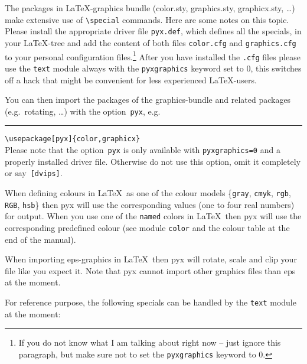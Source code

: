The packages in \LaTeX-graphics bundle (color.sty, graphics.sty,
graphicx.sty, \ldots) make extensive use of \verb|\special| commands. Here
are some notes on this topic. Please install the appropriate driver file
\verb|pyx.def|, which defines all the specials, in your \LaTeX-tree and add
the content of both files \verb|color.cfg| and \verb|graphics.cfg| to your
personal configuration files.\footnote{If you do not know what I am talking about
right now -- just ignore this paragraph, but make sure not to set the
\texttt{pyxgraphics} keyword to 0.} After you have installed the \verb|.cfg|
files please use the \verb|text| module always with the \verb|pyxgraphics|
keyword set to 0, this switches off a hack that might be convenient for less
experienced \LaTeX-users.\medskip

You can then import the packages of the graphics-bundle and related packages
(e.g.~rotating, \ldots) with the option~\verb|pyx|, e.g.{}\\
\rule{0.1\linewidth}{0sp}\verb|\usepackage[pyx]{color,graphicx}|\\
Please note that the option~\verb|pyx| is only available with
\verb|pyxgraphics=0| and a properly installed driver file. Otherwise do not
use this option, omit it completely or say~\verb|[dvips]|.\medskip

When defining colours in \LaTeX\ as one of the colour models \{\verb|gray|,
\verb|cmyk|, \verb|rgb|, \verb|RGB|, \verb|hsb|\} then pyx will use the
corresponding values (one to four real numbers) for output. When you use one of the
\verb|named| colors in \LaTeX\ then pyx will use the corresponding predefined
colour (see module \verb|color| and the colour table at the end of the
manual).

When importing eps-graphics in \LaTeX\ then pyx will rotate, scale and clip
your file like you expect it. Note that pyx cannot import other graphics files
than eps at the moment.\medskip

For reference purpose, the following specials can be handled by the
\verb|text| module at the moment:\medskip

